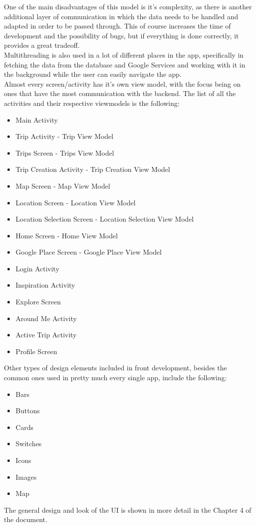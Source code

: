 One of the main disadvantages of this model is it's complexity, as there is another additional layer of communication in which the data needs to be handled and adapted in order to be passed through. This of course increases the time of development and the possibility of bugs, but if everything is done correctly, it provides a great tradeoff.\\
Multithreading is also used in a lot of different places in the app, specifically in fetching the data from the database and Google Services and working with it in the background while the user can easily navigate the app. 
\\

Almost every screen/activity has it's own view model, with the focus being on ones that have the most communication with the backend. The list of all the activities and their respective viewmodels is the following:
\begin{itemize}
\item Main Activity		
\item Trip Activity	 - Trip View Model
\item Trips Screen	 - Trips View Model
\item Trip Creation Activity	- Trip Creation View Model
\item Map Screen	 - Map View Model
\item Location Screen	 - Location View Model
\item Location Selection Screen	- Location Selection View Model
\item Home Screen	 - Home View Model
\item Google Place Screen	 - Google Place View Model
\item Login Activity
\item Inspiration Activity
\item Explore Screen
\item Around Me Activity
\item Active Trip Activity
\item Profile Screen
\end{itemize}
Other types of design elements included in front development, besides the common ones used in pretty much every single app, include the following:
\begin{itemize}
\item Bars
\item Buttons
\item Cards
\item Switches
\item Icons
\item Images
\item Map
\end{itemize}
The general design and look of the UI is shown in more detail in the Chapter 4 of the document.
\newpage

